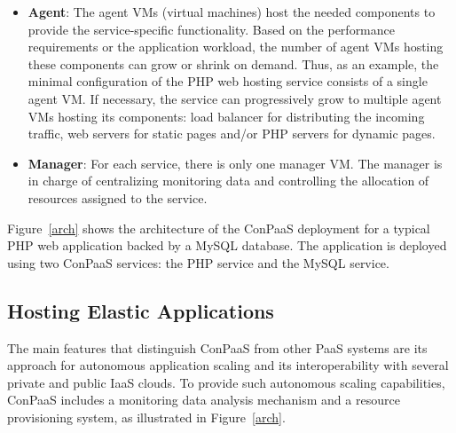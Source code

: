 \begin{itemize}
\item \textbf{Agent}: The agent VMs (virtual machines) host the needed components to provide the service-specific functionality. Based on the performance requirements or the application workload, the number of agent VMs hosting these components can grow or shrink on demand. Thus, as an example, the minimal configuration of the PHP web hosting service consists of a single agent VM. If necessary,
the service can progressively grow to multiple agent VMs hosting its components: load balancer for distributing the incoming traffic, web servers for static pages and/or PHP servers for dynamic pages. 
\item \textbf{Manager}: For each service, there is only one manager VM. The manager is in charge of centralizing monitoring data and controlling the allocation of resources assigned to the service. 
\end{itemize}

Figure~\ref{arch} shows the architecture of the ConPaaS deployment for a 
typical PHP web application backed by a MySQL database. The application is
deployed using two ConPaaS services: the PHP service and the MySQL service.


\subsection*{Hosting Elastic Applications}

The main features that distinguish ConPaaS from other PaaS systems are its approach for autonomous application scaling and its interoperability with several private and public IaaS clouds. To provide such autonomous scaling capabilities, ConPaaS includes a monitoring data analysis mechanism  and a resource provisioning system, as illustrated in Figure~\ref{arch}.

